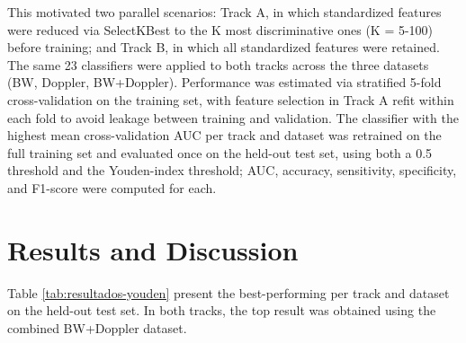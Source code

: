 \documentclass[12pt]{article}
\begin{document}
This motivated two parallel scenarios: Track A, in which standardized features were reduced via SelectKBest to the K most discriminative ones (K = 5-100) before training; and Track B, in which all standardized features were retained. The same 23 classifiers were applied to both tracks across the three datasets (BW, Doppler, BW+Doppler). Performance was estimated via stratified 5-fold cross-validation on the training set, with feature selection in Track A refit within each fold to avoid leakage between training and validation. The classifier with the highest mean cross-validation AUC per track and dataset was retrained on the full training set and evaluated once on the held-out test set, using both a 0.5 threshold and the Youden-index threshold; AUC, accuracy, sensitivity, specificity, and F1-score were computed for each.

\section{Results and Discussion}

Table \ref{tab:resultados-youden} present the best-performing per track and dataset on the held-out test set. In both tracks, the top result was obtained using the combined BW+Doppler dataset.

\begin{table}[ht]
\centering
\caption{Performance of the best classifiers per dataset in youden threshold (on the test data) - Tracks A and B}
\label{tab:resultados-youden}
\end{table}
\end{document}
